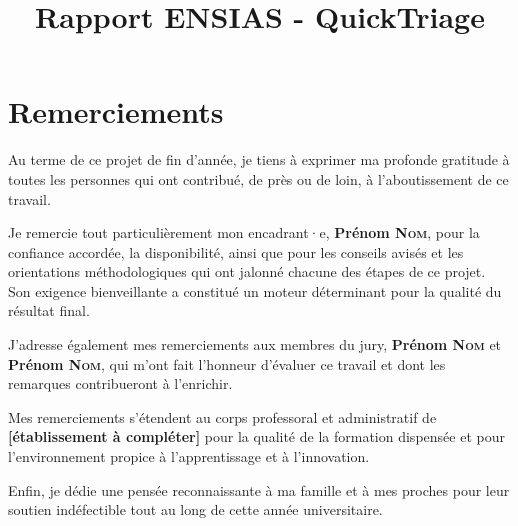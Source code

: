 \documentclass{rapportENSIAS}
\title{Rapport ENSIAS - QuickTriage}
\begin{document}






\fairemarges      %
\fairepagedegarde %

\chapter*{Remerciements}

Au terme de ce projet de fin d'année, je tiens à exprimer ma profonde gratitude à
toutes les personnes qui ont contribué, de près ou de loin, à l'aboutissement de ce
travail.

Je remercie tout particulièrement mon encadrant·e, \textbf{Prénom \textsc{Nom}}, pour
la confiance accordée, la disponibilité, ainsi que pour les conseils avisés et les
orientations méthodologiques qui ont jalonné chacune des étapes de ce projet. Son
exigence bienveillante a constitué un moteur déterminant pour la qualité du résultat
final.

J'adresse également mes remerciements aux membres du jury, \textbf{Prénom \textsc{Nom}}
et \textbf{Prénom \textsc{Nom}}, qui m'ont fait l'honneur d'évaluer ce travail et dont
les remarques contribueront à l'enrichir.

Mes remerciements s'étendent au corps professoral et administratif de
\textbf{[établissement à compléter]} pour la qualité de la formation dispensée et pour
l'environnement propice à l'apprentissage et à l'innovation.

Enfin, je dédie une pensée reconnaissante à ma famille et à mes proches pour leur
soutien indéfectible tout au long de cette année universitaire.
\end{document}
